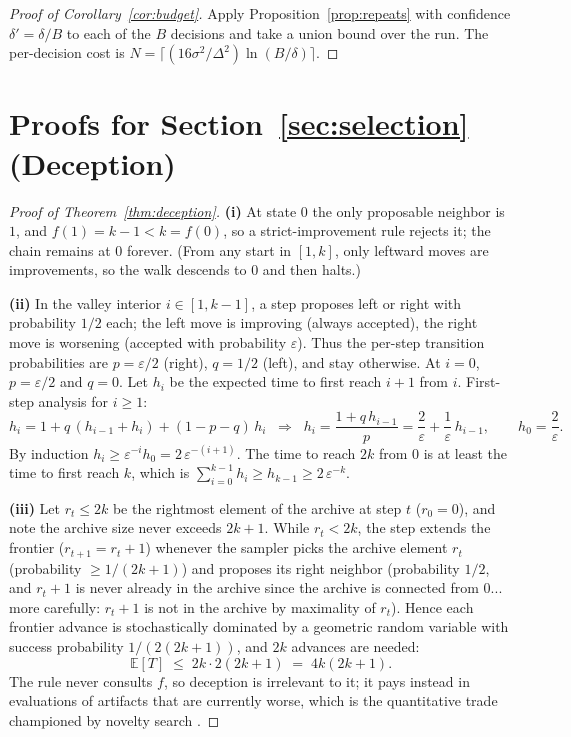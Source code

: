 \documentclass{article}
\theoremstyle{plain}
\theoremstyle{definition}
\theoremstyle{remark}
\newcommand{\E}{\mathbb{E}}
\newcommand{\eps}{\varepsilon}
\begin{document}
\begin{proof}[Proof of Corollary~\ref{cor:budget}]
Apply Proposition~\ref{prop:repeats} with confidence $\delta' = \delta/B$ to each of the $B$ decisions and take a union bound over the run. The per-decision cost is $N = \lceil (16\sigma^2/\Delta^2) \ln(B/\delta) \rceil$.
\end{proof}

\section{Proofs for Section~\ref{sec:selection} (Deception)}
\label{app:deception}

\begin{proof}[Proof of Theorem~\ref{thm:deception}]
\textbf{(i)} At state $0$ the only proposable neighbor is $1$, and $f(1) = k - 1 < k = f(0)$, so a strict-improvement rule rejects it; the chain remains at $0$ forever. (From any start in $[1, k]$, only leftward moves are improvements, so the walk descends to $0$ and then halts.)

\textbf{(ii)} In the valley interior $i \in [1, k-1]$, a step proposes left or right with probability $1/2$ each; the left move is improving (always accepted), the right move is worsening (accepted with probability $\eps$). Thus the per-step transition probabilities are $p = \eps/2$ (right), $q = 1/2$ (left), and stay otherwise. At $i = 0$, $p = \eps/2$ and $q = 0$. Let $h_i$ be the expected time to first reach $i+1$ from $i$. First-step analysis for $i \ge 1$:
\[
h_i = 1 + q\,(h_{i-1} + h_i) + (1 - p - q)\,h_i
\;\;\Longrightarrow\;\;
h_i = \frac{1 + q\, h_{i-1}}{p} = \frac{2}{\eps} + \frac{1}{\eps}\, h_{i-1},
\qquad h_0 = \frac{2}{\eps}.
\]
By induction $h_i \ge \eps^{-i} h_0 = 2\,\eps^{-(i+1)}$. The time to reach $2k$ from $0$ is at least the time to first reach $k$, which is $\sum_{i=0}^{k-1} h_i \ge h_{k-1} \ge 2\,\eps^{-k}$.

\textbf{(iii)} Let $r_t \le 2k$ be the rightmost element of the archive at step $t$ ($r_0 = 0$), and note the archive size never exceeds $2k+1$. While $r_t < 2k$, the step extends the frontier ($r_{t+1} = r_t + 1$) whenever the sampler picks the archive element $r_t$ (probability $\ge 1/(2k+1)$) and proposes its right neighbor (probability $1/2$, and $r_t + 1$ is never already in the archive since the archive is connected from $0$... more carefully: $r_t+1$ is not in the archive by maximality of $r_t$). Hence each frontier advance is stochastically dominated by a geometric random variable with success probability $1/(2(2k+1))$, and $2k$ advances are needed:
\[
\E[T] \;\le\; 2k \cdot 2(2k+1) \;=\; 4k(2k+1).
\]
The rule never consults $f$, so deception is irrelevant to it; it pays instead in evaluations of artifacts that are currently worse, which is the quantitative trade championed by novelty search \cite{lehman2011abandoning}.
\end{proof}
\end{document}
